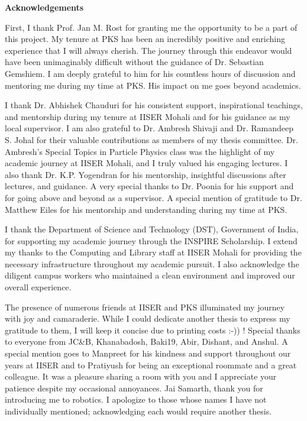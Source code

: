 \begin{center}
    {\Large\bfseries\sffamily  Acknowledgements}
\end{center}
\vspace{1cm}
    
First, I thank Prof. Jan M. Rost for granting me the opportunity to be a part of this project. My tenure at PKS has been an incredibly positive and enriching experience that I will always cherish. The journey through this endeavor would have been unimaginably difficult without the guidance of Dr. Sebastian Gemshiem. I am deeply grateful to him for his countless hours of discussion and mentoring me during my time at PKS. His impact on me goes beyond academics.

I thank Dr. Abhishek Chauduri for his consistent support, inspirational teachings, and mentorship during my tenure at IISER Mohali and for his guidance as my local supervisor. I am also grateful to Dr. Ambresh Shivaji and Dr. Ramandeep S. Johal for their valuable contributions as members of my thesis committee. Dr. Ambresh's Special Topics in Particle Physics class was the highlight of my academic journey at IISER Mohali, and I truly valued his engaging lectures. I also thank Dr. K.P. Yogendran for his mentorship, insightful discussions after lectures, and guidance. A very special thanks to Dr. Poonia for his support and for going above and beyond as a supervisor. A special mention of gratitude to Dr. Matthew Eiles for his mentorship and understanding during my time at PKS.

I thank the Department of Science and Technology (DST), Government of India, for supporting my academic journey through the INSPIRE Scholarship. I extend my thanks to the Computing and Library staff at IISER Mohali for providing the necessary infrastructure throughout my academic pursuit. I also acknowledge the diligent campus workers who maintained a clean environment and improved our overall experience.

The presence of numerous friends at IISER and PKS illuminated my journey with joy and camaraderie. While I could dedicate another thesis to express my gratitude to them, I will keep it concise due to printing costs :-)) ! Special thanks to everyone from JC\&B, Khanabadosh, Baki19, Abir, Dishant, and Anshul. A special mention goes to Manpreet for his kindness and support throughout our years at IISER and to Pratiyush for being an exceptional roommate and a great colleague. It was a pleasure sharing a room with you and I appreciate your patience despite my occasional annoyances. Jai Samarth, thank you for introducing me to robotics. I apologize to those whose names I have not individually mentioned; acknowledging each would require another thesis.

